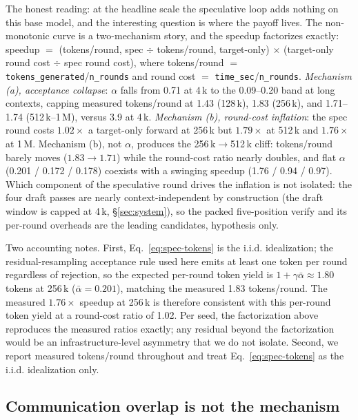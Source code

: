 \documentclass{article}
\begin{document}
The honest reading: at the headline scale the speculative loop
adds nothing on this base model, and the interesting question is
where the payoff lives. The non-monotonic curve is a two-mechanism
story, and the speedup factorizes exactly: speedup $=$
(tokens/round, spec $\div$ tokens/round, target-only) $\times$
(target-only round cost $\div$ spec round cost), where tokens/round
$=$ \texttt{tokens\_generated}/\texttt{n\_rounds} and round cost
$=$ \texttt{time\_sec}/\texttt{n\_rounds}. \emph{Mechanism (a),
acceptance collapse}: $\alpha$ falls from 0.71 at 4\,k to the
0.09--0.20 band at long contexts, capping measured tokens/round at
1.43 (128\,k), 1.83 (256\,k), and 1.71--1.74 (512\,k--1\,M),
versus 3.9 at 4\,k. \emph{Mechanism (b), round-cost inflation}:
the spec round costs $1.02\times$ a target-only forward at 256\,k
but $1.79\times$ at 512\,k and $1.76\times$ at 1\,M. Mechanism
(b), not $\alpha$, produces the 256\,k$\to$512\,k cliff:
tokens/round barely moves ($1.83 \to 1.71$) while the round-cost
ratio nearly doubles, and flat $\alpha$ (0.201 / 0.172 / 0.178)
coexists with a swinging speedup (1.76 / 0.94 / 0.97). Which
component of the speculative round drives the inflation is not
isolated: the four draft passes are nearly context-independent by
construction (the draft window is capped at 4\,k,
\S\ref{sec:system}), so the packed five-position verify and its
per-round overheads are the leading candidates, hypothesis only.

Two accounting notes. First, Eq.~\ref{eq:spec-tokens} is the
i.i.d. idealization; the residual-resampling acceptance rule used
here emits at least one token per round regardless of rejection,
so the expected per-round token yield is $1 + \gamma \bar\alpha
\approx 1.80$ tokens at 256\,k ($\bar\alpha = 0.201$), matching
the measured 1.83 tokens/round. The measured $1.76\times$ speedup
at 256\,k is therefore consistent with this per-round token yield
at a round-cost ratio of 1.02. Per seed, the factorization above
reproduces the measured ratios exactly; any residual beyond the
factorization would be an infrastructure-level asymmetry that we
do not isolate. Second, we report measured tokens/round
throughout and treat Eq.~\ref{eq:spec-tokens} as the i.i.d.
idealization only.

\subsection{Communication overlap is not the mechanism}
\label{sec:comm}
\end{document}
